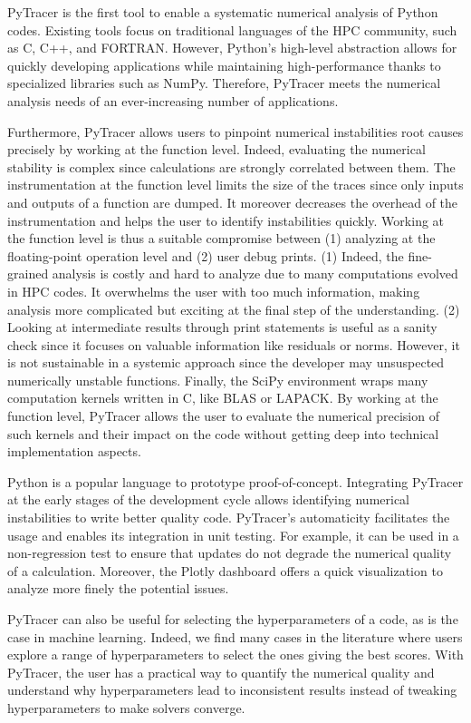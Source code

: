 \documentclass[11pt]{article}
\newcommand{\pytracer}[0]{PyTracer\xspace}
\begin{document}
\pytracer is the first tool to enable a systematic numerical analysis of Python codes. Existing tools focus on traditional languages of the HPC community, such as C, C++, and FORTRAN. However, Python's high-level abstraction allows for quickly developing applications while maintaining high-performance thanks to specialized libraries such as NumPy. Therefore, \pytracer meets the numerical analysis needs of an ever-increasing number of applications.

Furthermore, \pytracer allows users to pinpoint numerical instabilities root causes precisely by working at the function level. Indeed, evaluating the numerical stability is complex since calculations are strongly correlated between them. The instrumentation at the function level limits the size of the traces since only inputs and outputs of a function are dumped. It moreover decreases the overhead of the instrumentation and helps the user to identify instabilities quickly. Working at the function level is thus a suitable compromise between (1) analyzing at the floating-point operation level and (2) user debug prints. (1) Indeed, the fine-grained analysis is costly and hard to analyze due to many computations evolved in HPC codes. It overwhelms the user with too much information, making analysis more complicated but exciting at the final step of the understanding. (2) Looking at intermediate results through print statements 
is useful as a sanity check since it focuses on valuable information like residuals or norms.
However, it is not sustainable in a systemic approach since the developer may unsuspected numerically unstable functions. Finally, the SciPy environment wraps many computation kernels written in C, like BLAS or LAPACK. By working at the function level, \pytracer allows the user to evaluate the numerical precision of such kernels and their impact on the code without getting deep into technical implementation aspects. 

Python is a popular language to prototype proof-of-concept. Integrating \pytracer at the early stages of the development cycle allows identifying numerical instabilities to write better quality code.
\pytracer's automaticity facilitates the usage and enables its integration in unit testing.
For example, it can be used in a non-regression test to ensure that updates do not degrade the numerical quality of a calculation. Moreover, the Plotly dashboard offers a quick visualization to analyze more finely the potential issues.

\pytracer can also be useful for selecting the hyperparameters of a code, as is the case in machine learning.
Indeed, we find many cases in the literature where users explore a range of hyperparameters to select the ones giving the best scores. With \pytracer, the user has a practical way to quantify the numerical quality and understand why hyperparameters lead to inconsistent results instead of tweaking hyperparameters to make solvers converge.
\end{document}
